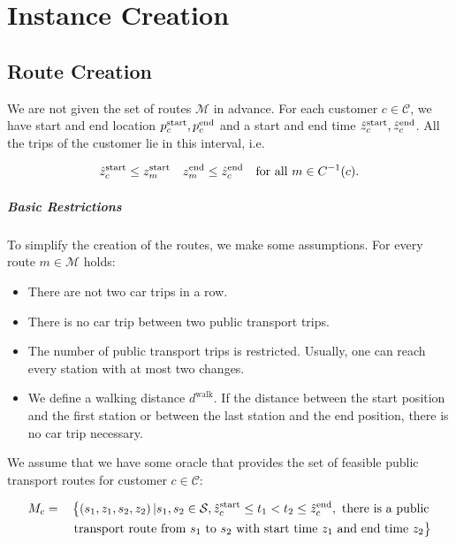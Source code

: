 \chapter{Instance Creation}
\label{ch:instance_creation}

\section{Route Creation}

We are not given the set of routes $\mathcal{M}$ in advance. For each customer $c\in\mathcal{C}$, we have start and end location $p^{\operatorname{start}}_c, p^{\operatorname{end}}_c$ and a start and end time $\hat{z}^{\operatorname{start}}_c, \hat{z}^{\operatorname{end}}_c$. All the trips of the customer lie in this interval, i.e.

\begin{align*}
	\hat{z}^{\operatorname{start}}_c \leq z^{\operatorname{start}}_m && z^{\operatorname{end}}_m \leq \hat{z}^{\operatorname{end}}_c && \text{for all } m\in C^{-1}(c).
\end{align*}

\paragraph{Basic Restrictions} \parfill

To simplify the creation of the routes, we make some assumptions. For every route $m\in\mathcal{M}$ holds:

\begin{itemize}
	\item{There are not two car trips in a row.}
	\item{There is no car trip between two public transport trips.}
	\item{The number of public transport trips is restricted. Usually, one can reach every station with at most two changes.}
	\item{We define a walking distance $d^{\operatorname{walk}}$. If the distance between the start position and the first station or between the last station and the end position, there is no car trip necessary.}
\end{itemize}

We assume that we have some oracle that provides the set of feasible public transport routes for customer $c\in\mathcal{C}$:

\begin{align*}
	M_c & = && \left\{\left(s_1,z_1,s_2,z_2\right)|s_1,s_2\in\mathcal{S}, \zstarto_c\leq t_1 < t_2 \leq \zendo_c, \text{ there is a public} \right. \\
	&&& \left.\vphantom{\zstarto}\text{transport route from $s_1$ to $s_2$ with start time $z_1$ and end time $z_2$}\right\}
\end{align*}


